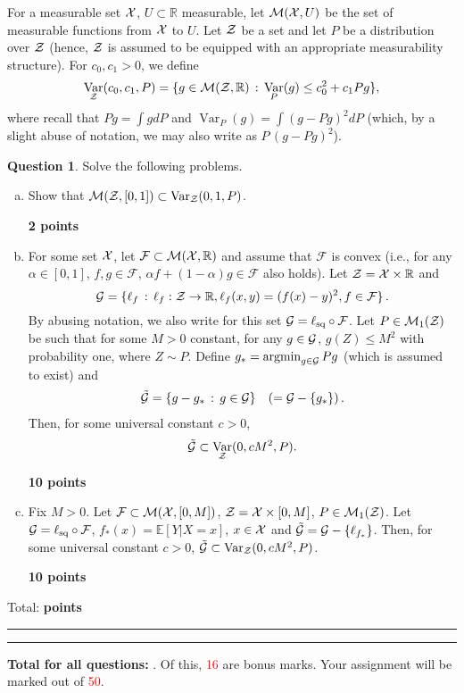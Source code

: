 \documentclass{article}
\newcommand{\R}{\mathbb{R}}
\DeclareMathOperator*{\argmin}{argmin}
\DeclareMathOperator{\Var}{Var}
\DeclareMathOperator*{\1}{\mathbbm{1}}
\newcommand{\E}{\mathbb E}
\newcommand{\EE}[1]{\E[#1]}
\newcommand{\cF}{\mathcal{F}}
\newcounter{DocPoints}
\newcounter{QuestionPoints}
\newcommand{\points}[1]{	\par\mbox{}\par\noindent\hfill {\bf #1 points}	\addtocounter{DocPoints}{#1}
	\addtocounter{QuestionPoints}{#1}
}
\newcommand{\tpoints}[1]{        	\ifthenelse{\isempty{#1}}	{	}	{		\addtocounter{DocPoints}{#1}
		\addtocounter{QuestionPoints}{#1}
	}													 	\par\mbox{}\par\noindent\hfill {Total: \bf \arabic{QuestionPoints}\xspace points}\par\mbox{}\par\hrule\hrule
	\setcounter{QuestionPoints}{0}
}
\theoremstyle{definition}
\newtheorem{question}{Question}
\theoremstyle{remark}
\begin{document}
For a measurable set $\mathcal{X}$, $U\subset \R$ measurable, let $\mathcal{M}(\mathcal{X},U)$ be the set of measurable functions from $\mathcal{X}$ to $U$.
Let $\mathcal{Z}$ be a set and let $P$ be a distribution over $\mathcal{Z}$ (hence, $\mathcal{Z}$ is assumed to be equipped with an appropriate measurability structure).
For $c_0,c_1>0$, we define 
\[
\Var_\cZ(c_0,c_1,P) = \{ g \in \cM(\cZ,\R)\, :\, \Var_P(g) \le c_0^2 + c_1 P g\},
\]
where recall that $Pg = \int g dP$ and $\Var_P(g) =
 \int (g-Pg)^2 dP$ (which, by  a slight abuse of notation, we may also write as 
 $P\, (g-Pg)^2$).


\begin{question}
Solve the following problems.
\begin{enumerate}[(a)]

\item Show that $\cM(\cZ,[0,1]) \subset \Var_{\cZ}(0,1,P)$. 
\points{2}

\item
For some set $\mathcal{X}$,  let $\cF \subset \cM(\cX,\R)$ and assume that $\cF$ is convex (i.e., for any $\alpha\in [0,1]$, $f,g\in \cF$, $\alpha f + (1-\alpha)g \in \cF$ also holds).
Let $\cZ = \cX \times \R$ and 
\[
\cG = \{ \ell_f \,:\, \ell_f: \cZ \to \R, \ell_f(x,y) = (f(x)-y)^2, f\in \cF \}\,.
\]
By abusing notation, we also write for this set  $\cG = \ell_{\text{sq}}\circ \cF$.
Let $P\in \mathcal{M}_1(\mathcal{Z})$ be such that
for some $M>0$ constant, for any $g\in \mathcal{G}$, $g(Z)\le M^2$ with probability one, where $Z\sim P$.
Define $g_* = \argmin_{g\in \cG} P g$ (which is assumed to exist) and 
\begin{align*}
\tilde{\mathcal{G}} = \{ g - g_* \,:\, g\in \mathcal{G} \}  \quad (= \mathcal{G} - \{ g_*\})\,.
\end{align*}
Then, for some universal constant $c>0$,
\begin{align*}
\tilde \cG \subset \Var_{\cZ}(0,c M^2,P).
\end{align*}
\points{10}

\item Fix $M>0$. Let $\cF \subset \cM(\cX,[0,M])$, $\mathcal{Z} = \mathcal{X} \times [0,M]$, $P\in \mathcal{M}_1(\mathcal{Z})$.
Let $\cG = \ell_{\text{sq}} \circ \cF$, $f_*(x) = \EE{Y|X=x}$, $x\in \mathcal{X}$ and 
$\tilde {\mathcal{G}} = \mathcal{G} - \{ \ell_{f_*} \}$.
Then, for some universal constant $c>0$,
 $\tilde \cG \subset \Var_{\cZ}(0,c M^2,P)$.
\points{10}

\end{enumerate}
 
\tpoints{}
\end{question}







\bigskip
\bigskip

\noindent
\textbf{
Total for all questions: }.
Of this, \textcolor{red}{16} are bonus marks. 
Your assignment will be marked out of \textcolor{red}{50}.
\end{document}
